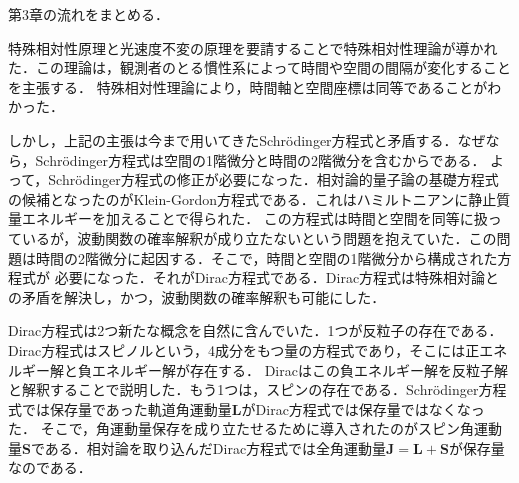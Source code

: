 \documentclass{report}
\begin{document}
第3章の流れをまとめる．

特殊相対性原理と光速度不変の原理を要請することで特殊相対性理論が導かれた．この理論は，観測者のとる慣性系によって時間や空間の間隔が変化することを主張する．
特殊相対性理論により，時間軸と空間座標は同等であることがわかった．

しかし，上記の主張は今まで用いてきたSchrödinger方程式と矛盾する．なぜなら，Schrödinger方程式は空間の1階微分と時間の2階微分を含むからである．
よって，Schrödinger方程式の修正が必要になった．相対論的量子論の基礎方程式の候補となったのがKlein-Gordon方程式である．これはハミルトニアンに静止質量エネルギーを加えることで得られた．
この方程式は時間と空間を同等に扱っているが，波動関数の確率解釈が成り立たないという問題を抱えていた．この問題は時間の2階微分に起因する．そこで，時間と空間の1階微分から構成された方程式が
必要になった．それがDirac方程式である．Dirac方程式は特殊相対論との矛盾を解決し，かつ，波動関数の確率解釈も可能にした．

Dirac方程式は2つ新たな概念を自然に含んでいた．1つが反粒子の存在である．Dirac方程式はスピノルという，4成分をもつ量の方程式であり，そこには正エネルギー解と負エネルギー解が存在する．
Diracはこの負エネルギー解を反粒子解と解釈することで説明した．もう1つは，スピンの存在である．Schrödinger方程式では保存量であった軌道角運動量$\bm{L}$がDirac方程式では保存量ではなくなった．
そこで，角運動量保存を成り立たせるために導入されたのがスピン角運動量$\bm{S}$である．相対論を取り込んだDirac方程式では全角運動量$\bm{J} = \bm{L} + \bm{S}$が保存量なのである．
\end{document}
